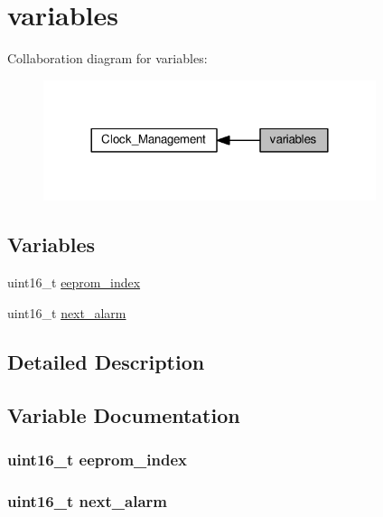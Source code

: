 \hypertarget{group__clock__management}{}\section{variables}
\label{group__clock__management}
Collaboration diagram for variables\+:\nopagebreak
\begin{figure}[H]
\begin{center}
\leavevmode
\includegraphics[width=276pt]{d9/dfc/group__clock__management}
\end{center}
\end{figure}
\subsection*{Variables}
\begin{DoxyCompactItemize}
\item 
uint16\+\_\+t \hyperlink{group__clock__management_gadafaa69421576ac611d507121be2e8f2}{eeprom\+\_\+index}
\item 
uint16\+\_\+t \hyperlink{group__clock__management_gaae2a6d57125e1b394a897958b141986b}{next\+\_\+alarm}
\end{DoxyCompactItemize}


\subsection{Detailed Description}


\subsection{Variable Documentation}
\subsubsection[{\texorpdfstring{eeprom\+\_\+index}{eeprom_index}}]{\setlength{\rightskip}{0pt plus 5cm}uint16\+\_\+t eeprom\+\_\+index}\hypertarget{group__clock__management_gadafaa69421576ac611d507121be2e8f2}{}\label{group__clock__management_gadafaa69421576ac611d507121be2e8f2}
\subsubsection[{\texorpdfstring{next\+\_\+alarm}{next_alarm}}]{\setlength{\rightskip}{0pt plus 5cm}uint16\+\_\+t next\+\_\+alarm}\hypertarget{group__clock__management_gaae2a6d57125e1b394a897958b141986b}{}\label{group__clock__management_gaae2a6d57125e1b394a897958b141986b}
